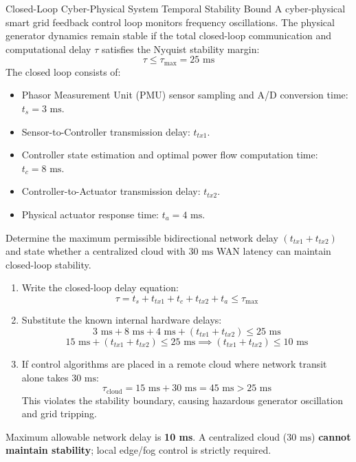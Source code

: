 \begin{solved}{Closed-Loop Cyber-Physical System Temporal Stability Bound}
\Given A cyber-physical smart grid feedback control loop monitors frequency oscillations. The physical generator dynamics remain stable if the total closed-loop communication and computational delay $\tau$ satisfies the Nyquist stability margin:
\begin{equation}
\tau \le \tau_{\max} = 25\text{ ms}
\end{equation}
The closed loop consists of:
\begin{itemize}[leftmargin=*]
  \item Phasor Measurement Unit (PMU) sensor sampling and A/D conversion time: $t_s = 3\text{ ms}$.
  \item Sensor-to-Controller transmission delay: $t_{tx1}$.
  \item Controller state estimation and optimal power flow computation time: $t_c = 8\text{ ms}$.
  \item Controller-to-Actuator transmission delay: $t_{tx2}$.
  \item Physical actuator response time: $t_a = 4\text{ ms}$.
\end{itemize}
Determine the maximum permissible bidirectional network delay $(t_{tx1} + t_{tx2})$ and state whether a centralized cloud with $30\text{ ms}$ WAN latency can maintain closed-loop stability.
\Steps
\begin{enumerate}[leftmargin=*]
  \item Write the closed-loop delay equation:
  \begin{equation}
  \tau = t_s + t_{tx1} + t_c + t_{tx2} + t_a \le \tau_{\max}
  \end{equation}
  \item Substitute the known internal hardware delays:
  \begin{equation}
  3\text{ ms} + 8\text{ ms} + 4\text{ ms} + (t_{tx1} + t_{tx2}) \le 25\text{ ms}
  \end{equation}
  \begin{equation}
  15\text{ ms} + (t_{tx1} + t_{tx2}) \le 25\text{ ms} \implies (t_{tx1} + t_{tx2}) \le 10\text{ ms}
  \end{equation}
  \item If control algorithms are placed in a remote cloud where network transit alone takes $30\text{ ms}$:
  \begin{equation}
  \tau_{\text{cloud}} = 15\text{ ms} + 30\text{ ms} = 45\text{ ms} > 25\text{ ms}
  \end{equation}
  This violates the stability boundary, causing hazardous generator oscillation and grid tripping.
\end{enumerate}
\Answer Maximum allowable network delay is \textbf{10 ms}. A centralized cloud ($30\text{ ms}$) \textbf{cannot maintain stability}; local edge/fog control is strictly required.
\end{solved}

